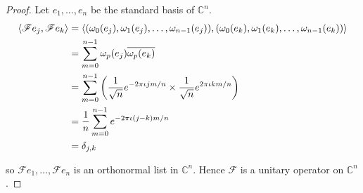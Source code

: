 \begin{proof}
    Let $e_{1}, \ldots, e_{n}$ be the standard basis of $\mathbb{C}^{n}$.
    \begin{align*}
        \left\langle{\mathscr{F}e_{j}, \mathscr{F}e_{k}}\right\rangle & = \left\langle{(\omega_{0}(e_{j}), \omega_{1}(e_{j}), \ldots, \omega_{n-1}(e_{j})), (\omega_{0}(e_{k}), \omega_{1}(e_{k}), \ldots, \omega_{n-1}(e_{k}))}\right\rangle \\
                                                       & = \sum^{n-1}_{m=0}\omega_{p}(e_{j})\overline{\omega_{p}(e_{k})}                                                                                            \\
                                                       & = \sum^{n-1}_{m=0}\left(\frac{1}{\sqrt{n}}e^{-2\pi\iota jm/n} \times \frac{1}{\sqrt{n}}e^{2\pi\iota km/n}\right)                                       \\
                                                       & = \frac{1}{n}\sum^{n-1}_{m=0}e^{-2\pi\iota (j - k)m/n}                                                                                                 \\
                                                       & = \delta_{j,k}
    \end{align*}

    so $\mathscr{F}e_{1}, \ldots, \mathscr{F}e_{n}$ is an orthonormal list in $\mathbb{C}^{n}$. Hence $\mathscr{F}$ is a unitary operator on $\mathbb{C}^{n}$.


\end{proof}
